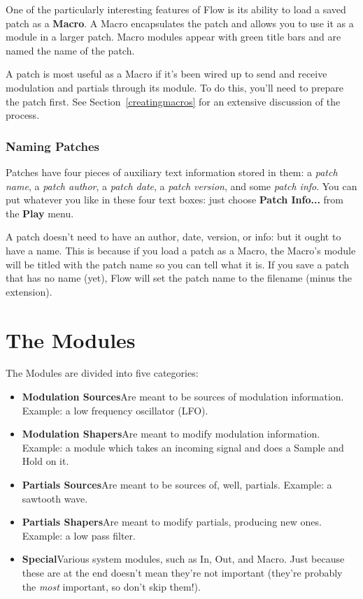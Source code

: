 \documentclass{article}
\newcommand\bump{\vspace{20in}}
\newcommand\name{Flow}
\begin{document}
One of the particularly interesting features of {\name} is its ability to load a saved patch as a {\bf Macro}.  A Macro encapsulates the patch and allows you to use it as a module in a larger patch.  Macro modules appear with green title bars and are named the name of the patch.

A patch is most useful as a Macro if it's been wired up to send and receive modulation and partials through its module.  To do this, you'll need to prepare the patch first.  See Section~\ref{creatingmacros} for an extensive discussion of the process.

\subsubsection{Naming Patches}

Patches have four pieces of auxiliary text information stored in them: a {\it patch name}, a {\it patch author}, a {\it patch date}, a {\it patch version}, and some {\it patch info}.  You can put whatever you like in these four text boxes: just choose {\bf Patch Info...} from the {\bf Play} menu.

A patch doesn't need to have an author, date, version, or info: but it ought to have a name.  This is because if you load a patch as a Macro, the Macro's module will be titled with the patch name so you can tell what it is.  If you save a patch that has no name (yet), {\name} will set the patch name to the filename (minus the extension).

\bump
\section{The Modules}

The Modules are divided into five categories:

\begin{itemize}
\item {\bf Modulation Sources}\quad Are meant to be sources of modulation information.  Example: a low frequency oscillator (LFO).
\item {\bf Modulation Shapers}\quad Are meant to modify modulation information.  Example: a module which takes an incoming signal and does a Sample and Hold on it.
\item {\bf Partials Sources}\quad Are meant to be sources of, well, partials.  Example: a sawtooth wave.
\item {\bf Partials Shapers}\quad Are meant to modify partials, producing new ones.  Example: a low pass filter.
\item {\bf Special}\quad Various system modules, such as In, Out, and Macro.  Just because these are at the end doesn't mean they're not important (they're probably the {\it most} important, so don't skip them!).
\end{itemize}
\end{document}
